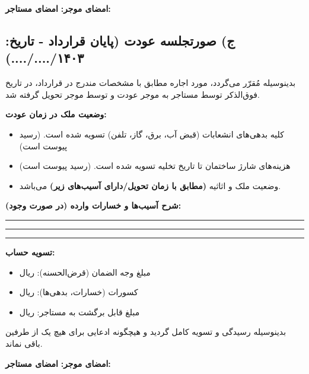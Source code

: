 \documentclass[12pt]{article}
\begin{document}
	\vspace{1cm}
	\noindent
	\textbf{امضای موجر:} \hrulefill \hspace{2cm} \textbf{امضای مستاجر:} \hrulefill
	
	\vspace{2cm}
	\subsection*{ج) صورتجلسه عودت (پایان قرارداد - تاریخ: ۱۴۰۳/..../....)}
	\noindent
	بدینوسیله مُقرّر می‌گردد، مورد اجاره مطابق با مشخصات مندرج در قرارداد، در تاریخ فوق‌الذکر توسط مستاجر به موجر عودت و توسط موجر تحویل گرفته شد.
	
	\noindent
	\textbf{وضعیت ملک در زمان عودت:}
	
	\begin{itemize}
		\item کلیه بدهی‌های انشعابات (قبض آب، برق، گاز، تلفن) تسویه شده است. (رسید پیوست است)
		\item هزینه‌های شارژ ساختمان تا تاریخ تخلیه تسویه شده است. (رسید پیوست است)
		\item وضعیت ملک و اثاثیه \textbf{(مطابق با زمان تحویل/دارای آسیب‌های زیر)} می‌باشد.
	\end{itemize}
	
	\noindent
	\textbf{شرح آسیب‌ها و خسارات وارده (در صورت وجود):}
	\vspace{1cm}
	\hrule
	\vspace{0.5cm}
	\hrule
	\vspace{0.5cm}
	\hrule
	
	\noindent
	\textbf{تسویه حساب:}
	\begin{itemize}
		\item مبلغ وجه الضمان (قرض‌الحسنه): \underline{\hspace{4cm}} ریال
		\item کسورات (خسارات، بدهی‌ها): \underline{\hspace{4cm}} ریال
		\item مبلغ قابل برگشت به مستاجر: \underline{\hspace{4cm}} ریال
	\end{itemize}
	
	\noindent
	بدینوسیله رسیدگی و تسویه کامل گردید و هیچگونه ادعایی برای هیچ یک از طرفین باقی نماند.
	
	\vspace{1.5cm}
	\noindent
	\textbf{امضای موجر:} \hrulefill \hspace{2cm} \textbf{امضای مستاجر:} \hrulefill
	
\end{document}
